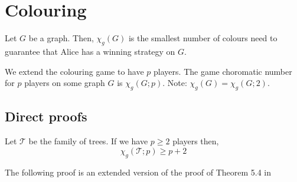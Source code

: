 \chapter{Colouring}



\begin{definition}
    Let $G$ be a graph. Then, $\chi_g(G)$ is the smallest number of colours need to guarantee that Alice has a winning strategy on $G$. 
    
\end{definition}

\begin{definition}
    We extend the colouring game to have $p$ players. The game choromatic number for $p$ players on some graph $G$ is $\chi_g(G;p)$. Note: $\chi_g(G) = \chi_g(G;2)$.
\end{definition}

\section{Direct proofs}

\begin{theorem}
    Let $\mathcal{T}$ be the family of trees. If we have $p \geq 2$ players then,
    \[\chi_g(\mathcal{T};p) \geq p + 2 \]
\end{theorem}

The following proof is an extended version of the proof of Theorem 5.4 in \cite[Bodlaender 1990]{bodlander1990}

